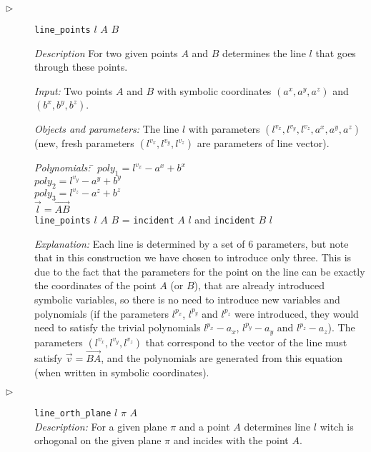 \documentclass[final,1p,times,authoryear]{elsarticle}
\begin{document}
\begin{description}
\item[$\triangleright$] {\tt line\_points} $l$ $A$ $B$

  {\em Description} For two given points $A$ and $B$ determines the
  line $l$ that goes through these points.


  {\em Input:} Two points $A$ and $B$ with symbolic coordinates $(a^x,
  a^y, a^z)$ and $(b^x, b^y, b^z)$.

  {\em Objects and parameters:} The line $l$ with parameters
  $(l^{v_x}, l^{v_y}, l^{v_z}, a^x, a^y, a^z)$ (new, fresh parameters
  $(l^{v_x}, l^{v_y}, l^{v_z})$ are parameters of line vector).

\begin{tabbing}
{\em Polynomials:} \= $poly_1 = l^{v_x} - a^x + b^x$ \\
                   \> $poly_2 = l^{v_y} - a^y + b^y$ \\
                   \> $poly_3 = l^{v_z} - a^z + b^z$ \\
                   \> $\overrightarrow{l} = \overrightarrow{AB}$ \\
                   \> {\tt line\_points} $l$ $A$ $B$ = {\tt incident} $A$ $l$ and {\tt incident} $B$ $l$
\end{tabbing}

{\em Explanation:} Each line is determined by a set of 6 parameters,
but note that in this construction we have chosen to introduce only
three. This is due to the fact that the parameters for the point on
the line can be exactly the coordinates of the point $A$ (or $B$),
that are already introduced symbolic variables, so there is no need to
introduce new variables and polynomials (if the parameters $l^{p_x}$,
$l^{p_y}$ and $l^{p_z}$ were introduced, they would need to satisfy
the trivial polynomials $l^{p_x} - a_x$, $l^{p_y}-a_y$ and $l^{p_z} -
a_z$). The parameters $(l^{v_x}, l^{v_y}, l^{v_z})$ that correspond to
the vector of the line must satisfy $\overrightarrow{v} =
\overrightarrow{BA}$, and the polynomials are generated from this
equation (when written in symbolic coordinates).

\item[$\triangleright$] {\tt line\_orth\_plane} $l$ $\pi$ $A$ \\

{\em Description:} For a given plane $\pi$ and a point $A$ determines
line $l$ witch is orhogonal on the given plane $\pi$ and incides with
the point $A$.


\end{description}
\end{document}
